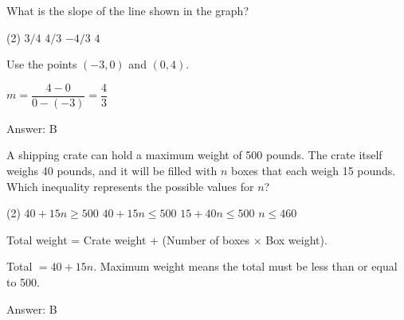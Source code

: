 \documentclass[11pt,paper=a4,answers]{exam}
\begin{document}
\begin{questions}
\vspace{1cm}

\question
\begin{center}
\end{center}
What is the slope of the line shown in the graph?
\begin{tasks}(2)
\task $3/4$ \task $4/3$ \task $-4/3$ \task $4$
\end{tasks}

\begin{solution}
Use the points $(-3, 0)$ and $(0, 4)$.
\vspace{5pt}
\begin{center}
$m = \dfrac{4 - 0}{0 - (-3)} = \dfrac{4}{3}$
\end{center}
\vspace{5pt}
Answer: \colorbox{yellow!100}{B}
\end{solution}

\vspace{1cm}

\question
A shipping crate can hold a maximum weight of 500 pounds. The crate itself weighs 40 pounds, and it will be filled with $n$ boxes that each weigh 15 pounds. Which inequality represents the possible values for $n$?
\begin{tasks}(2)
\task $40 + 15n \geq 500$
\task $40 + 15n \leq 500$
\task $15 + 40n \leq 500$
\task $n \leq 460$
\end{tasks}

\begin{solution}
Total weight = Crate weight + (Number of boxes $\times$ Box weight).
\vspace{5pt}
\begin{center}
Total $= 40 + 15n$.
\vspace{5pt}
Maximum weight means the total must be less than or equal to 500.
\end{center}
\vspace{5pt}
Answer: \colorbox{yellow!100}{B}
\end{solution}


\end{questions}
\end{document}
